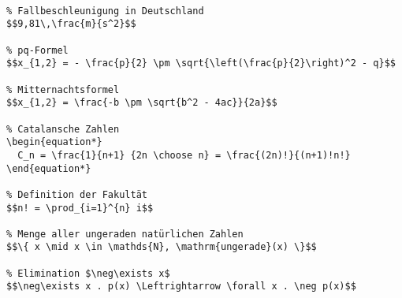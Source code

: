 \begin{verbatim}

% Fallbeschleunigung in Deutschland
$$9,81\,\frac{m}{s^2}$$

% pq-Formel
$$x_{1,2} = - \frac{p}{2} \pm \sqrt{\left(\frac{p}{2}\right)^2 - q}$$

% Mitternachtsformel
$$x_{1,2} = \frac{-b \pm \sqrt{b^2 - 4ac}}{2a}$$

% Catalansche Zahlen
\begin{equation*}
  C_n = \frac{1}{n+1} {2n \choose n} = \frac{(2n)!}{(n+1)!n!}
\end{equation*}

% Definition der Fakultät
$$n! = \prod_{i=1}^{n} i$$

% Menge aller ungeraden natürlichen Zahlen
$$\{ x \mid x \in \mathds{N}, \mathrm{ungerade}(x) \}$$

% Elimination $\neg\exists x$
$$\neg\exists x . p(x) \Leftrightarrow \forall x . \neg p(x)$$
\end{verbatim}